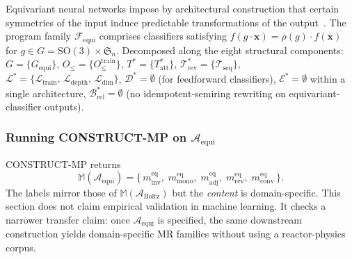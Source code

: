 \documentclass[acmsmall,screen,review]{acmart}
\begin{document}
Equivariant neural networks impose by architectural construction that certain symmetries of the input induce predictable transformations of the output~\cite{CohenWelling2016, ThomasSmidt2018, KondorTrivedi2018, Bronstein2021GDL}. The program family $\mathcal{F}_{\mathrm{equi}}$ comprises classifiers satisfying $f(g\cdot \mathbf{x}) = \rho(g)\cdot f(\mathbf{x})$ for $g \in G = \mathrm{SO}(3) \times \mathfrak{S}_n$. Decomposed along the eight structural components: $G = \{G_{\mathrm{equi}}\}$, $O_{\le} = \{O_{\le}^{\mathrm{train}}\}$, $T^{*} = \{T^{*}_{\mathrm{att}}\}$, $\mathcal{T}^{*}_{\mathrm{rev}} = \{\mathcal{T}_{\mathrm{seq}}\}$, $\mathcal{L}^{*} = \{\mathcal{L}_{\mathrm{train}},\, \mathcal{L}_{\mathrm{depth}},\, \mathcal{L}_{\mathrm{dim}}\}$, $\mathcal{D}^{*} = \emptyset$ (for feedforward classifiers), $\mathcal{E}^{*} = \emptyset$ within a single architecture, $\mathcal{B}^{*}_{\mathrm{rel}} = \emptyset$ (no idempotent-semiring rewriting on equivariant-classifier outputs).

\subsubsection{Running CONSTRUCT-MP on \texorpdfstring{$\mathcal{A}_{\mathrm{equi}}$}{A\_equi}}

CONSTRUCT-MP returns
$$\mathbb{M}(\mathcal{A}_{\mathrm{equi}}) = \bigl\{\,m^{\mathrm{eq}}_{\mathrm{inv}},\; m^{\mathrm{eq}}_{\mathrm{mono}},\; m^{\mathrm{eq}}_{\mathrm{adj}},\; m^{\mathrm{eq}}_{\mathrm{rev}},\; m^{\mathrm{eq}}_{\mathrm{conv}}\,\bigr\}.$$
The labels mirror those of $\mathbb{M}(\mathcal{A}_{\mathrm{Boltz}})$ but the \emph{content} is domain-specific. This section does not claim empirical validation in machine learning. It checks a narrower transfer claim: once $\mathcal{A}_{\mathrm{equi}}$ is specified, the same downstream construction yields domain-specific MR families without using a reactor-physics corpus.
\end{document}
